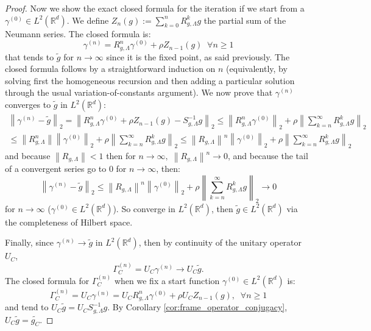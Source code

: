 \documentclass[final,1p,times,authoryear]{elsarticle}
\theoremstyle{definition}
\newcommand{\R}{\mathbb{R}}
\newcommand{\1}{\mathbf{1}}
\begin{document}
\begin{proof}
Now we show the exact closed formula for the iteration if we start from a $\gamma^{(0)} \in L^2(\mathbb{R}^d)$. We define $Z_n(g):=\sum_{k=0}^nR_{g,\Lambda}^kg$ the partial sum of the Neumann series.
The closed formula is:
\begin{equation} \gamma^{(n)}=R^{n}_{g,\Lambda}\gamma^{(0)}+\rho Z_{n-1}(g)\; \;  \forall n \ge 1
\end{equation}
that tends to $\tilde{g}$ for $n \to \infty$ since it is the fixed point, as said previously. The closed formula follows by a straightforward induction on $n$ (equivalently, by solving first the
homogeneous recursion and then adding a particular solution through the usual variation-of-constants argument).
We now prove that $\gamma^{(n)}$ converges to $\widetilde g$ in $L^2(\R^d)$:
\begin{equation}
\begin{split}
    \left\|\gamma^{(n)}-\tilde{g}\right\|_{2}=\left\|R_{g,\Lambda}^{n}\gamma^{(0)}+\rho Z_{n-1}(g)- S_{g,\Lambda}^{-1}g\right\|_{2} \le \left\|R_{g,\Lambda}^{n}\gamma^{(0)}\right\|_{2}+ \rho \left\|\displaystyle\sum_{k=n}^{\infty}R_{g,\Lambda}^kg\right\|_{2 }\\\le \left\|R_{g,\Lambda}^{n}\right\|\left\|\gamma^{(0)}\right\|_{2}+ \rho \left\|\displaystyle\sum_{k=n}^{\infty}R_{g,\Lambda}^kg\right\|_{2 } \le \left\|R_{g,\Lambda}\right\|^n\left\|\gamma^{(0)}\right\|_{2}+ \rho \left\|\displaystyle\sum_{k=n}^{\infty}R_{g,\Lambda}^kg\right\|_{2 }
    \end{split}
\end{equation} and because $\left\|R_{g,\Lambda}\right\|<1$ then for $n  \to   \infty,  \; \left\|R_{g,\Lambda}\right\|^n \to 0 $, and because the tail of a convergent series go to 0 for $n \to \infty$, then:
\begin{equation}
    \left\|\gamma^{(n)}-\tilde{g}\right\|_{2}\le  \left\|R_{g,\Lambda}\right\|^n\left\|\gamma^{(0)}\right\|_{2} +  \rho \left\|\displaystyle\sum_{k=n}^{\infty}R_{g,\Lambda}^kg\right\|_{2 } \to 0
\end{equation} for $n \to \infty$ ($\gamma^{(0)} \in L^2(\mathbb{R}^d)$). So converge in $L^2(\mathbb{R}^d)$, then $\tilde{g} \in L^2(\mathbb{R}^d)$ via the completeness of Hilbert space.

Finally, since $\gamma^{(n)}\to \widetilde g$ in $L^2(\mathbb{R}^d)$, then by continuity of the unitary operator $U_C$,
$$
\Gamma_C^{(n)}=U_C\gamma^{(n)}\to U_C\widetilde g.
$$
The closed formula for $\Gamma^{(n)}_C$ when we fix a start function $\gamma^{(0)} \in L^2(\mathbb{R}^d)$ is:
\begin{equation}
    \Gamma^{(n)}_C=U_C\gamma^{(n)}=U_CR^{n}_{g,\Lambda}\gamma^{(0)}+\rho U_CZ_{n-1}(g),\; \;  \forall n \ge 1
\end{equation}
 and tend to $U_C\tilde{g}=U_C S^{-1}_{g,\Lambda}g $. By Corollary \ref{cor:frame_operator_conjugacy}, $U_C\widetilde g=\widetilde{g_C}$.
\end{proof}
\end{document}
